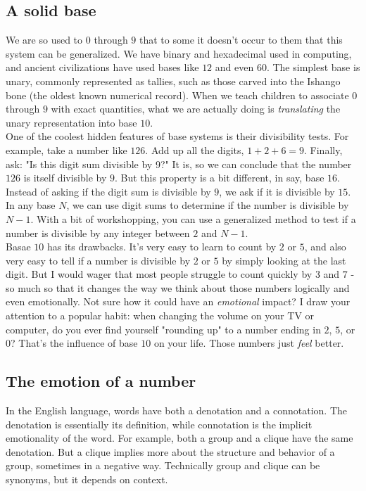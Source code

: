 \documentclass{article}
\begin{document}
\subsection*{A solid base}

\hspace{\parindent}We are so used to $0$ through $9$ that to some it doesn't occur to them that this system can be generalized. We have binary and hexadecimal used in computing, and ancient civilizations have used bases like $12$ and even $60$. The simplest base is unary, commonly represented as tallies, such as those carved into the Ishango bone (the oldest known numerical record). When we teach children to associate $0$ through $9$ with exact quantities, what we are actually doing is \textit{translating} the unary representation into base $10$.\\

One of the coolest hidden features of base systems is their divisibility tests. For example, take a number like $126$. Add up all the digits, $1 + 2 + 6 = 9$. Finally, ask: "Is this digit sum divisible by 9?" It is, so we can conclude that the number $126$ is itself divisible by $9$. But this property is a bit different, in say, base $16$. Instead of asking if the digit sum is divisible by $9$, we ask if it is divisible by $15$. In any base $N$, we can use digit sums to determine if the number is divisible by $N-1$. With a bit of workshopping, you can use a generalized method to test if a number is divisible by any integer between $2$ and $N-1$.\\

Basae $10$ has its drawbacks. It's very easy to learn to count by $2$ or $5$, and also very easy to tell if a number is divisible by $2$ or $5$ by simply looking at the last digit. But I would wager that most people struggle to count quickly by $3$ and $7$ - so much so that it changes the way we think about those numbers logically and even emotionally. Not sure how it could have an \textit{emotional} impact? I draw your attention to a popular habit: when changing the volume on your TV or computer, do you ever find yourself "rounding up" to a number ending in $2$, $5$, or $0$? That's the influence of base $10$ on your life. Those numbers just \textit{feel} better.

\subsection*{The emotion of a number}

\hspace{\parindent}In the English language, words have both a denotation and a connotation. The denotation is essentially its definition, while connotation is the implicit emotionality of the word. For example, both a group and a clique have the same denotation. But a clique implies more about the structure and behavior of a group, sometimes in a negative way. Technically group and clique can be synonyms, but it depends on context.\\
\end{document}
